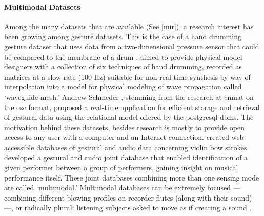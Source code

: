\documentclass[
]{book}
\newcommand{\see}[1]{(See \ref{#1})}
\begin{document}
\paragraph{Multimodal Datasets}
Among the many datasets that are available \see{mir}, a research interest has been growing among gesture datasets. This is the case of a hand drumming gesture dataset that uses data from a two-dimensional pressure sensor that could be compared to the membrane of a drum \parencite{DBLP:conf/icmc/JonesLS07}. \citeauthor{DBLP:conf/icmc/JonesLS07} aimed to provide physical model designers with a collection of six techniques of hand drumming, recorded as matrices at a slow rate (100 Hz) suitable for non-real-time synthesis by way of interpolation into a model for physical modeling of wave propagation called `waveguide mesh.' Andrew Schmeder \parencite{icmc/bbp2372.2009.005}, stemming from the research at \gls{cnmat} on the \gls{osc} format, proposed a real-time application for efficient storage and retrieval of gestural data using the relational model offered by the \gls{postgresql} \gls{dbms}. The motivation behind these datasets, besides research is mostly to provide open access to any user with a computer and an Internet connection. \textcite{Young2007} created web-accessible databases of gestural and audio data concerning violin bow strokes. \textcite{Hochenbaum2010} developed a gestural and audio joint database that enabled identification of a given performer between a group of performers, gaining insight on musical performance itself. These joint databases combining more than one sensing mode are called `multimodal.' Multimodal databases can be extremely focused ---combining different blowing profiles on recorder flutes (along with their sound) \parencite{Garcia2011}---, or radically plural: listening subjects asked to move as if creating a sound \parencite{fvisi:2017}. 
\end{document}
